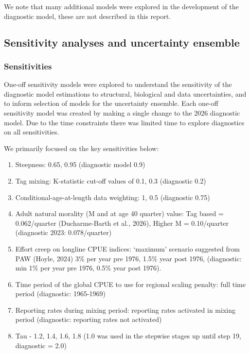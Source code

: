 \documentclass[
  english,
  a4paper,
  a4paper,
  11pt]{SCreport}
\begin{document}
We note that many additional models were explored in the development of
the diagnostic model, these are not described in this report.

\subsection{Sensitivity analyses and uncertainty
ensemble}\label{sec-sensitivity-structural-uncertainty}

\subsubsection{Sensitivities}\label{sec-sensitivities}

One-off sensitivity models were explored to understand the sensitivity
of the diagnostic model estimations to structural, biological and data
uncertainties, and to inform selection of models for the uncertainty
ensemble. Each one-off sensitivity model was created by making a single
change to the 2026 diagnostic model. Due to the time constraints there
was limited time to explore diagnostics on all sensitivities.

We primarily focused on the key sensitivities below:

\begin{enumerate}
\def\labelenumi{\arabic{enumi}.}
\item
  Steepness: 0.65, 0.95 (diagnostic model 0.9)
\item
  Tag mixing: K-statistic cut-off values of 0.1, 0.3 (diagnostic 0.2)
\item
  Conditional-age-at-length data weighting: 1, 0.5 (diagnostic 0.75)
\item
  Adult natural morality (M and at age 40 quarter) value: Tag based =
  0.062/quarter (Ducharme-Barth et al., 2026), Higher M = 0.10/quarter
  (diagnostic 2023: 0.078/quarter)
\item
  Effort creep on longline CPUE indices: `maximum' scenario suggested
  from PAW (Hoyle, 2024) 3\% per year pre 1976, 1.5\% year post 1976,
  (diagnostic: min 1\% per year pre 1976, 0.5\% year post 1976).
\item
  Time period of the global CPUE to use for regional scaling penalty:
  full time period (diagnostic: 1965-1969)
\item
  Reporting rates during mixing period: reporting rates activated in
  mixing period (diagnostic: reporting rates not activated)
\item
  Tau - 1.2, 1.4, 1.6, 1.8 (1.0 was used in the stepwise stages up until
  step 19, diagnostic = 2.0)
\end{enumerate}
\end{document}
